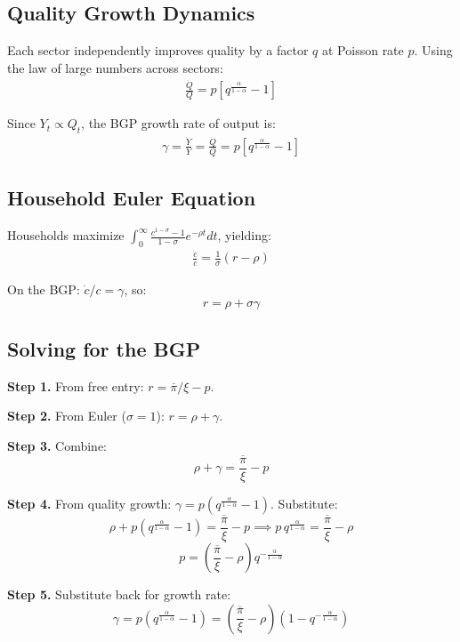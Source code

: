 \documentclass[a4paper,11pt]{article}
\newcommand{\pibar}{\overline{\pi}}
\begin{document}
\subsection*{Quality Growth Dynamics}

Each sector independently improves quality by a factor $q$ at Poisson rate $p$. Using the law of large numbers across sectors:
\begin{align*}
\frac{\dot{Q}}{Q} = p\left[q^{\frac{\alpha}{1-\alpha}} - 1\right]
\tag{Quality Growth}
\end{align*}

Since $Y_t \propto Q_t$, the BGP growth rate of output is:
\begin{align*}
\boxed{\gamma = \frac{\dot{Y}}{Y} = \frac{\dot{Q}}{Q} = p\left[q^{\frac{\alpha}{1-\alpha}} - 1\right]}
\tag{BGP Output Growth}
\end{align*}

\subsection*{Household Euler Equation}

Households maximize $\int_0^\infty \frac{c^{1-\sigma}-1}{1-\sigma}e^{-\rho t}dt$, yielding:
\begin{align*}
\frac{\dot{c}}{c} = \frac{1}{\sigma}(r - \rho)
\tag{Euler}
\end{align*}

On the BGP: $\dot{c}/c = \gamma$, so:
\[
r = \rho + \sigma\gamma
\]

\subsection*{Solving for the BGP}

\begin{derivationbox}[title={Derivation: BGP Growth Rate (log utility, $\sigma=1$)}]
\textbf{Step 1.} From free entry: $r = \pibar/\xi - p$.

\textbf{Step 2.} From Euler ($\sigma=1$): $r = \rho + \gamma$.

\textbf{Step 3.} Combine:
\[
\rho + \gamma = \frac{\pibar}{\xi} - p
\]

\textbf{Step 4.} From quality growth: $\gamma = p(q^{\frac{\alpha}{1-\alpha}} - 1)$. Substitute:
\[
\rho + p\left(q^{\frac{\alpha}{1-\alpha}} - 1\right) = \frac{\pibar}{\xi} - p
\implies p\, q^{\frac{\alpha}{1-\alpha}} = \frac{\pibar}{\xi} - \rho
\]
\[
\boxed{p = \left(\frac{\pibar}{\xi} - \rho\right) q^{-\frac{\alpha}{1-\alpha}}}
\]

\textbf{Step 5.} Substitute back for growth rate:
\[
\gamma = p\left(q^{\frac{\alpha}{1-\alpha}} - 1\right) = \left(\frac{\pibar}{\xi} - \rho\right)\left(1 - q^{-\frac{\alpha}{1-\alpha}}\right)
\]
\end{derivationbox}
\end{document}
